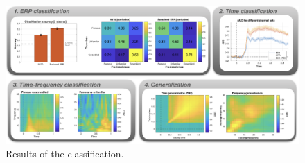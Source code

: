 \documentclass[utf8]{frontiersSCNS} %
\begin{document}
\begin{figure}[ht!]
\centering\includegraphics[width=\linewidth]{MVPA_results}
\caption{Results of the classification.}\label{fig:results}
\end{figure}

\end{document}
